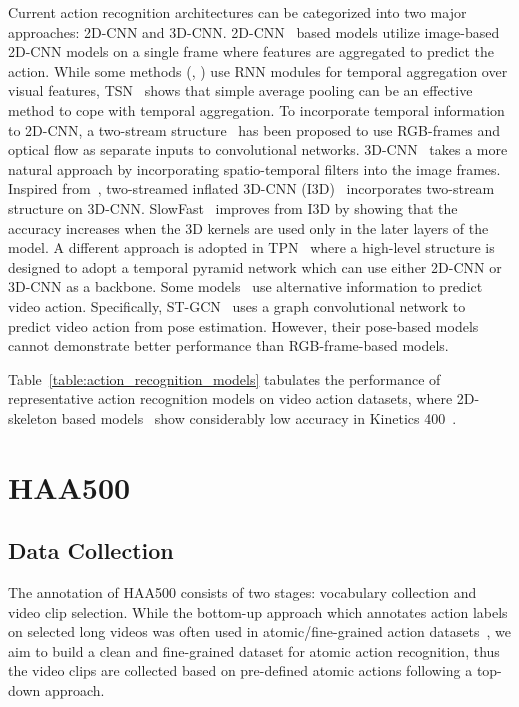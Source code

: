 \documentclass[10pt,twocolumn,letterpaper]{article}
\begin{document}
Current action recognition architectures can be categorized into two major approaches: 2D-CNN and 3D-CNN. 2D-CNN~\cite{LRCN,feichtenhofer2016convolutional,TSM,DBLP:conf/nips/SimonyanZ14,TSN,TRN} based models utilize image-based 2D-CNN models on a single frame where features are aggregated to predict the action. While some methods (\eg, \cite{LRCN}) use RNN modules for temporal aggregation over visual features, TSN~\cite{TSN} shows that simple average pooling can be an effective method to cope with temporal aggregation. To incorporate temporal information to 2D-CNN, a two-stream structure~\cite{feichtenhofer2016convolutional,DBLP:conf/nips/SimonyanZ14} has been proposed to use RGB-frames and optical flow as separate inputs to convolutional networks.
3D-CNN~\cite{i3d,slowfast,stm} takes a more natural approach by incorporating spatio-temporal filters into the image frames. Inspired from~\cite{DBLP:conf/nips/SimonyanZ14}, two-streamed inflated 3D-CNN (I3D)~\cite{i3d} incorporates two-stream structure on 3D-CNN. SlowFast~\cite{slowfast} improves from I3D by showing that the accuracy increases when the 3D kernels are used only in the later layers of the model. A different approach is adopted in TPN~\cite{TPN} where a high-level structure is designed to adopt a temporal pyramid network which can use either 2D-CNN or 3D-CNN as a backbone. Some models~\cite{ke2017new,kim2017interpretable,stgcn} use alternative information to predict video action. Specifically, ST-GCN~\cite{stgcn} uses a graph convolutional network to predict video action from pose estimation. However, their pose-based models cannot demonstrate better performance than RGB-frame-based models.

Table~\ref{table:action_recognition_models} tabulates the performance of representative action recognition models on video action datasets, where 2D-skeleton based models~\cite{nturgbd,stgcn} show considerably low accuracy in Kinetics 400~\cite{kinetics400}.

\vspace{-0.5em}
\section{HAA500}

\subsection{Data Collection}
\vspace{-0.5em}
The annotation of HAA500 consists of two stages: vocabulary collection and video clip selection. 
While the bottom-up approach which annotates action labels on selected long videos was often used in atomic/fine-grained action datasets~\cite{AVA,finegym},
we aim to build a clean and fine-grained dataset for atomic action recognition, thus the video clips are collected based on pre-defined atomic actions following a top-down approach.
\end{document}
